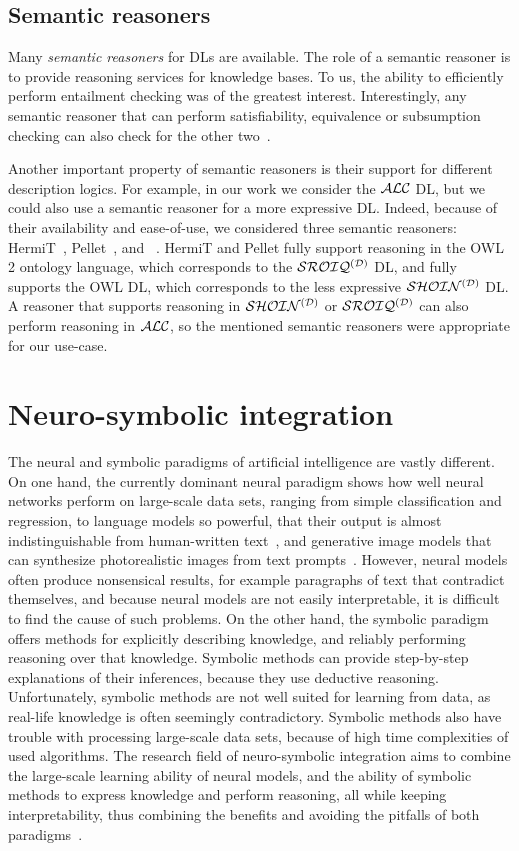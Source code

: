 \subsection{Semantic reasoners}

Many \emph{semantic reasoners} for DLs are available.
The role of a semantic reasoner is to provide reasoning services for knowledge bases.
To us, the ability to efficiently perform entailment checking was of the greatest interest.
Interestingly, any semantic reasoner that can perform satisfiability, equivalence or subsumption checking can also check for the other two~\cite{baader_introduction_2017}.

Another important property of semantic reasoners is their support for different description logics.
For example, in our work we consider the $\mathcal{ALC}$ DL, but we could also use a semantic reasoner for a more expressive DL.
Indeed, because of their availability and ease-of-use, we considered three semantic reasoners: HermiT~\cite{shearer_hermit_2008}, Pellet~\cite{sirin_pellet_2007}, and \factpp{}~\cite{tsarkov_fact_2006}.
HermiT and Pellet fully support reasoning in the OWL 2 ontology language, which corresponds to the $\mathcal{SROIQ^{(D)}}$ DL, and \factpp{} fully supports the OWL DL, which corresponds to the less expressive $\mathcal{SHOIN^{(D)}}$ DL.
A reasoner that supports reasoning in $\mathcal{SHOIN^{(D)}}$ or $\mathcal{SROIQ^{(D)}}$ can also perform reasoning in $\mathcal{ALC}$, so the mentioned semantic reasoners were appropriate for our use-case.

\section{Neuro-symbolic integration}

The neural and symbolic paradigms of artificial intelligence are vastly different.
On one hand, the currently dominant neural paradigm shows how well neural networks perform on large-scale data sets, ranging from simple classification and regression, to language models so powerful, that their output is almost indistinguishable from human-written text~\cite{brown_language_2020}, and generative image models that can synthesize photorealistic images from text prompts~\cite{ramesh_hierarchical_2022}.
However, neural models often produce nonsensical results, for example paragraphs of text that contradict themselves, and because neural models are not easily interpretable, it is difficult to find the cause of such problems.
On the other hand, the symbolic paradigm offers methods for explicitly describing knowledge, and reliably performing reasoning over that knowledge.
Symbolic methods can provide step-by-step explanations of their inferences, because they use deductive reasoning.
Unfortunately, symbolic methods are not well suited for learning from data, as real-life knowledge is often seemingly contradictory.
Symbolic methods also have trouble with processing large-scale data sets, because of high time complexities of used algorithms.
The research field of neuro-symbolic integration aims to combine the large-scale learning ability of neural models, and the ability of symbolic methods to express knowledge and perform reasoning, all while keeping interpretability, thus combining the benefits and avoiding the pitfalls of both paradigms~\cite{ebrahimi_towards_2021}.

